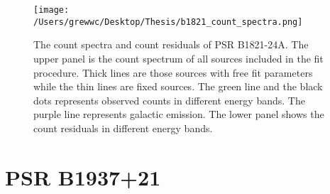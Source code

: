 \documentclass[12pt]{report}
\newcommand{\mycaption}[1]{\protect \caption{#1}}
\begin{document}
      
      
          \begin{figure}[!ht]
            \centering
            \texttt{[image: /Users/grewwc/Desktop/Thesis/b1821\_count\_spectra.png]}
            \caption{The count spectra and count residuals of PSR B1821-24A.
                  The upper panel is the count spectrum of all sources included in the 
                    fit procedure. Thick lines are those sources with free fit parameters 
                    while the thin lines are fixed sources. The green line and the black 
                    dots represents observed counts in different energy bands. The purple 
                    line represents galactic emission. The lower panel shows the count 
                    residuals in different energy bands. } 
            \label{fig: j0218_count_spectra}
          \end{figure}


        \section{PSR B1937+21}
\end{document}
